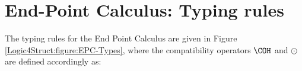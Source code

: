 


\section{End-Point Calculus: Typing rules}
\label{Logic4Struct:appendix:EPC-Types}

The typing rules for the End Point Calculus are given in Figure \ref{Logic4Struct:figure:EPC-Types}, where
the compatibility operators $\COH$ and $\odot$
are defined accordingly as:

